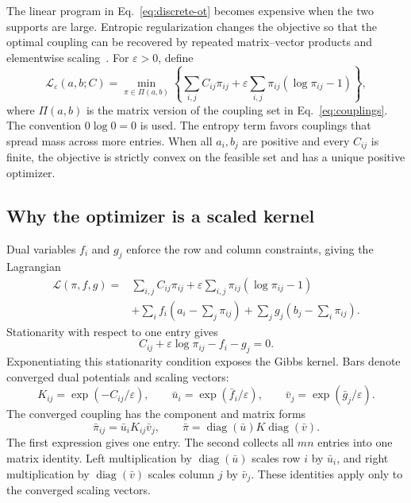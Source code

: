 \documentclass[11pt]{article}
\begin{document}
The linear program in Eq.~\eqref{eq:discrete-ot} becomes expensive when the
two supports are large. Entropic regularization changes the objective so that
the optimal coupling can be recovered by repeated matrix--vector products and
elementwise scaling~\cite{cuturi-2013,xie-2025}. For $\varepsilon>0$, define
\begin{equation}
  \mathcal L_\varepsilon(a,b;C)
  =\min_{\pi\in\Pi(a,b)}
  \left\{
    \sum_{i,j}C_{ij}\pi_{ij}
    +\varepsilon\sum_{i,j}\pi_{ij}(\log\pi_{ij}-1)
  \right\},
  \label{eq:entropic-ot}
\end{equation}
where $\Pi(a,b)$ is the matrix version of the coupling set in
Eq.~\eqref{eq:couplings}. The convention $0\log0=0$ is used. The entropy
term favors couplings that spread mass across more entries. When all
$a_i,b_j$ are positive and every $C_{ij}$ is finite, the objective is
strictly convex on the feasible set and has a unique positive optimizer.

\subsection{Why the optimizer is a scaled kernel}

Dual variables $f_i$ and $g_j$ enforce the row and column constraints, giving
the Lagrangian
\begin{equation}
  \begin{aligned}
  \mathcal L(\pi,f,g)
  ={}&\sum_{i,j}C_{ij}\pi_{ij}
     +\varepsilon\sum_{i,j}\pi_{ij}(\log\pi_{ij}-1)\\
    &+\sum_i f_i\left(a_i-\sum_j\pi_{ij}\right)
     +\sum_j g_j\left(b_j-\sum_i\pi_{ij}\right).
  \end{aligned}
  \label{eq:sinkhorn-lagrangian}
\end{equation}
Stationarity with respect to one entry gives
\begin{equation}
  C_{ij}+\varepsilon\log\pi_{ij}-f_i-g_j=0.
\end{equation}
Exponentiating this stationarity condition exposes the Gibbs kernel. Bars
denote converged dual potentials and scaling vectors:
\begin{equation}
  K_{ij}=\exp(-C_{ij}/\varepsilon),
  \qquad
  \bar u_i=\exp(\bar f_i/\varepsilon),
  \qquad
  \bar v_j=\exp(\bar g_j/\varepsilon).
  \label{eq:gibbs-kernel}
\end{equation}
The converged coupling has the component and matrix forms
\begin{equation}
  \bar\pi_{ij}=\bar u_iK_{ij}\bar v_j,
  \qquad
  \bar\pi=\operatorname{diag}(\bar u)K\operatorname{diag}(\bar v).
  \label{eq:sinkhorn-scaling}
\end{equation}
The first expression gives one entry. The second collects all $mn$ entries
into one matrix identity. Left multiplication by
$\operatorname{diag}(\bar u)$ scales row $i$ by $\bar u_i$, and right
multiplication by $\operatorname{diag}(\bar v)$ scales column $j$ by
$\bar v_j$. These identities apply only to the converged scaling vectors.
\end{document}
